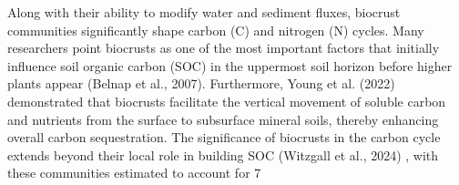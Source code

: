 Along with their ability to modify water and sediment fluxes, biocrust communities significantly shape carbon (C) and nitrogen (N) cycles. Many researchers point biocrusts as one of the most important factors that initially influence soil organic carbon (SOC) in the uppermost soil horizon before higher plants appear (Belnap et al., 2007). Furthermore, Young et al. (2022) demonstrated that biocrusts facilitate the vertical movement of soluble carbon and nutrients from the surface to subsurface mineral soils, thereby enhancing overall carbon sequestration. The significance of biocrusts in the carbon cycle extends beyond their local role in building SOC (Witzgall et al., 2024) , with these communities estimated to account for 7%

